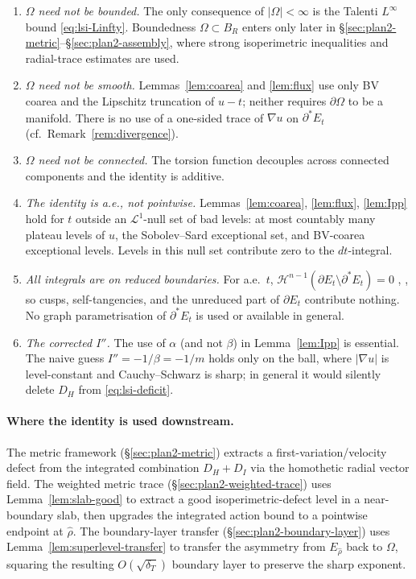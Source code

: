 \begin{enumerate}
\item {\it $\Omega$ need not be bounded.} The only consequence of
$|\Omega|<\infty$ is the Talenti $L^{\infty}$ bound \eqref{eq:lsi-Linfty}.
Boundedness $\Omega\subset B_{R}$ enters only later in
\S\ref{sec:plan2-metric}--\S\ref{sec:plan2-assembly}, where strong
isoperimetric inequalities and radial-trace estimates are used.
\item {\it $\Omega$ need not be smooth.} Lemmas~\ref{lem:coarea} and
\ref{lem:flux} use only BV coarea \cite[Theorem 13.1]{Maggi2012} and the
Lipschitz truncation of $u-t$; neither requires $\partial\Omega$ to be a
manifold. There is no use of a one-sided trace of $\nabla u$ on
$\partial^{*}E_{t}$ (cf.\ Remark~\ref{rem:divergence}).
\item {\it $\Omega$ need not be connected.} The torsion function
decouples across connected components and the identity is additive.
\item {\it The identity is a.e., not pointwise.} Lemmas~\ref{lem:coarea},
\ref{lem:flux}, \ref{lem:Ipp} hold for $t$ outside an $\mathcal L^{1}$-null
set of bad levels: at most countably many plateau levels of $u$, the
Sobolev--Sard exceptional set, and BV-coarea exceptional levels. Levels
in this null set contribute zero to the $dt$-integral.
\item {\it All integrals are on reduced boundaries.} For a.e.\ $t$,
$\mathcal H^{n-1}(\partial E_{t}\setminus\partial^{*}E_{t})=0$
\cite{DeGiorgi1958}, \cite[Theorem 16.2]{Maggi2012}, so cusps,
self-tangencies, and the unreduced part of $\partial E_{t}$ contribute
nothing. No graph parametrisation of $\partial^{*}E_{t}$ is used or
available in general.
\item {\it The corrected $I''$.} The use of $\alpha$ (and not $\beta$) in
Lemma~\ref{lem:Ipp} is essential. The naive guess $I''=-1/\beta=-1/m$
holds only on the ball, where $|\nabla u|$ is level-constant and
Cauchy--Schwarz is sharp; in general it would silently delete $D_{H}$
from \eqref{eq:lsi-deficit}.
\end{enumerate}

\paragraph{Where the identity is used downstream.}
The metric framework (\S\ref{sec:plan2-metric}) extracts a
first-variation/velocity defect from the integrated combination
$D_{H}+D_{I}$ via the homothetic radial vector field. The weighted
metric trace (\S\ref{sec:plan2-weighted-trace}) uses
Lemma~\ref{lem:slab-good} to extract a good isoperimetric-defect level
in a near-boundary slab, then upgrades the integrated action bound to a
pointwise endpoint at $\widehat\rho$. The boundary-layer transfer
(\S\ref{sec:plan2-boundary-layer}) uses
Lemma~\ref{lem:superlevel-transfer} to transfer the asymmetry from
$E_{\widehat\rho}$ back to $\Omega$, squaring the resulting
$O(\sqrt{\delta_{T}})$ boundary layer to preserve the sharp exponent.
